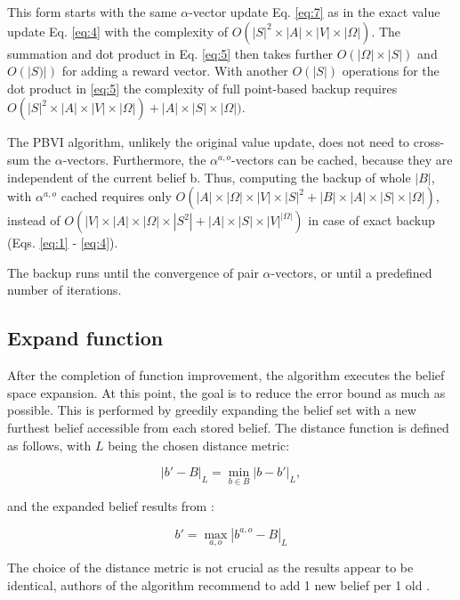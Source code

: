 This form starts with the same $\alpha$-vector update Eq. \ref{eq:7} as in the exact value update Eq. \ref{eq:4} with the complexity of $O(|S|^2 \times |A| \times |V| \times |\Omega|)$. The summation and dot product in Eq. \ref{eq:5} then takes further $O(|\Omega| \times |S|)$ and $O(|S)|)$ for adding a reward vector. With another $O(|S|)$ operations for the dot product in \ref{eq:5} the complexity of full point-based backup requires $O(|S|^2 \times |A| \times |V| \times |\Omega|) + |A| \times |S| \times |\Omega|)$.

The PBVI algorithm, unlikely the original value update, does not need to cross-sum the $\alpha$-vectors. Furthermore, the $\alpha^{a, o}$-vectors can be cached, because they are independent of the current belief b. Thus, computing the backup of whole $|B|$, with $\alpha^{a, o}$ cached requires only $O(|A| \times |\Omega| \times |V| \times |S|^2 +
|B|\times|A|\times|S|\times|\Omega|)$, instead of $O(|V| \times |A| \times |\Omega| \times |S^2| + |A| \times |S| \times |V|^{|\Omega|})$ in case of exact backup (Eqs. \ref{eq:1} - \ref{eq:4}).


The backup runs until the convergence of pair $\alpha$-vectors, or until a predefined number of iterations.

\subsection{Expand function}

After the completion of function improvement, the algorithm executes the belief space expansion. At this point, the goal is to reduce the error bound as much as possible. This is performed by greedily expanding the belief set with a new furthest belief accessible from each stored belief. The distance function is defined as follows, with $L$ being the chosen distance metric:

\begin{equation}|b' - B|_L = \operatorname*{min}_{b \in B} |b - b'|_L,\end{equation}

and the expanded belief results from :

\begin{equation}b' = \operatorname*{max}_{a, o} |b^{a, o} - B|_L\end{equation}

The choice of the distance metric is not crucial as the results appear to be identical, authors of the algorithm recommend to add 1 new belief per 1 old \cite{pbvi}.


